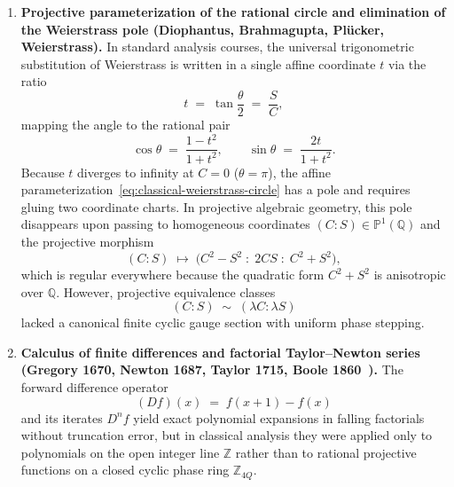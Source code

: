 \documentclass[11pt,a4paper]{article}
\theoremstyle{plain}
\theoremstyle{definition}
\begin{document}
\begin{enumerate}[label=\textbf{(\arabic*)},leftmargin=*]
\item \textbf{Projective parameterization of the rational circle and elimination of the Weierstrass pole (Diophantus, Brahmagupta, Pl\"ucker, Weierstrass).}
  In standard analysis courses, the universal trigonometric substitution of Weierstrass is written in a single affine coordinate $t$ via the ratio
  \begin{equation}
    \label{eq:classical-weierstrass-affine}
    t \;=\; \tan\frac{\theta}{2} \;=\; \frac{S}{C},
  \end{equation}
  mapping the angle to the rational pair
  \begin{equation}
    \label{eq:classical-weierstrass-circle}
    \cos\theta \;=\; \frac{1 - t^2}{1 + t^2},
    \qquad
    \sin\theta \;=\; \frac{2t}{1 + t^2}.
  \end{equation}
  Because $t$ diverges to infinity at $C = 0$ ($\theta = \pi$), the affine parameterization~\eqref{eq:classical-weierstrass-circle} has a pole and requires gluing two coordinate charts. In projective algebraic geometry, this pole disappears upon passing to homogeneous coordinates $(C : S) \in \mathbb{P}^1(\mathbb{Q})$ and the projective morphism
  \begin{equation}
    \label{eq:projective-weierstrass-map}
    (C : S) \;\longmapsto\; \bigl(C^2 - S^2 \;:\; 2CS \;:\; C^2 + S^2\bigr),
  \end{equation}
  which is regular everywhere because the quadratic form $C^2 + S^2$ is anisotropic over $\mathbb{Q}$. However, projective equivalence classes
  \[
    (C : S) \;\sim\; (\lambda C : \lambda S)
  \]
  lacked a canonical finite cyclic gauge section with uniform phase stepping.

\item \textbf{Calculus of finite differences and factorial Taylor--Newton series (Gregory 1670, Newton 1687, Taylor 1715, Boole 1860~\cite{Boole1860}).}
  The forward difference operator
  \begin{equation}
    \label{eq:intro-forward-diff}
    (Df)(x) \;=\; f(x+1) - f(x)
  \end{equation}
  and its iterates $D^n f$ yield exact polynomial expansions in falling factorials without truncation error, but in classical analysis they were applied only to polynomials on the open integer line $\mathbb{Z}$ rather than to rational projective functions on a closed cyclic phase ring $\mathbb{Z}_{4Q}$.


\end{enumerate}
\end{document}
